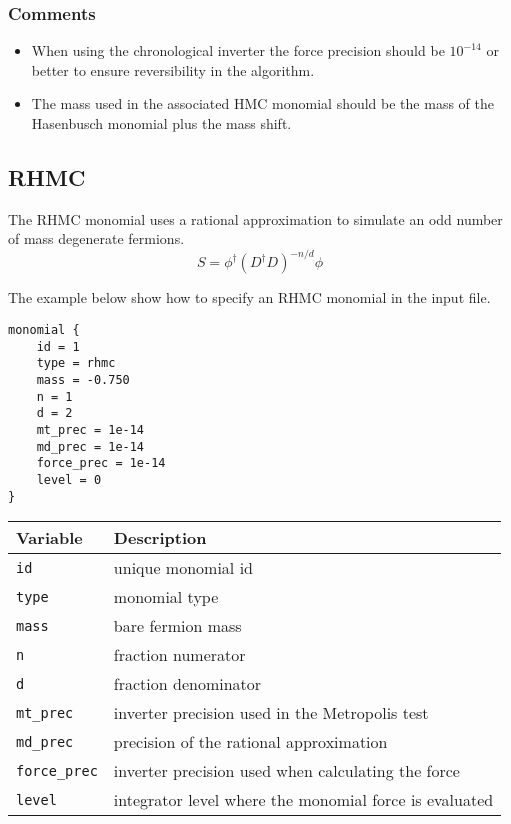 \documentclass[12pt]{article}
\begin{document}
\vspace{2mm}
\subsubsection*{Comments}
\begin{itemize}
 \item When using the chronological inverter the force precision should be $10^{-14}$ or better to ensure reversibility in the algorithm.
 \item The mass used in the associated HMC monomial should be the mass of the Hasenbusch monomial plus the mass shift.
\end{itemize}


\newpage
\subsection*{RHMC}
The RHMC monomial uses a rational approximation to simulate an odd number of mass degenerate fermions.
\begin{equation}
 S = \phi^\dagger(D^\dagger D)^{-n/d}\phi
\end{equation}

The example below show how to specify an RHMC monomial in the input file.
\begin{center}
\begin{minipage}{55mm}
\begin{framed}
\begin{verbatim}
monomial {
    id = 1
    type = rhmc
    mass = -0.750
    n = 1
    d = 2
    mt_prec = 1e-14
    md_prec = 1e-14
    force_prec = 1e-14
    level = 0
}
\end{verbatim}
\vspace{-5mm}
\end{framed}
\end{minipage}
\end{center}

\vspace{2mm}

\begin{center}
\begin{tabular}{l|l}
 Variable & Description \\
 \hline
 \verb|id|         & unique monomial id \\
 \verb|type|       & monomial type \\
 \verb|mass|       & bare fermion mass \\
 \verb|n|          & fraction numerator \\
 \verb|d|          & fraction denominator \\
 \verb|mt_prec|    & inverter precision used in the Metropolis test \\
 \verb|md_prec|    & precision of the rational approximation \\
 \verb|force_prec| & inverter precision used when calculating the force \\
 \verb|level|      & integrator level where the monomial force is evaluated
\end{tabular}
\end{center}
\end{document}
